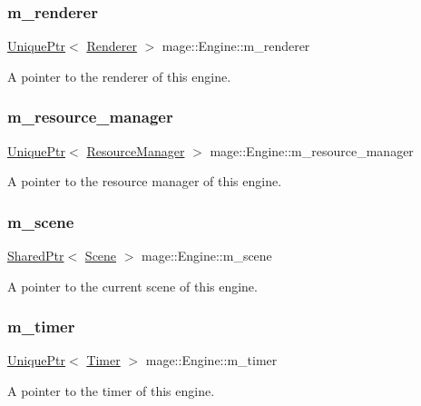 \subsubsection{\texorpdfstring{m\+\_\+renderer}{m\_renderer}}
{\footnotesize\ttfamily \hyperlink{namespacemage_a8c307fbcc33bce9b7f2aa4c26c3b95cf}{Unique\+Ptr}$<$ \hyperlink{classmage_1_1_renderer}{Renderer} $>$ mage\+::\+Engine\+::m\+\_\+renderer\hspace{0.3cm}{\ttfamily [private]}}

A pointer to the renderer of this engine. \hypertarget{classmage_1_1_engine_ac8d94579e72983a99a78be6b9b606a28}{}\label{classmage_1_1_engine_ac8d94579e72983a99a78be6b9b606a28} 
\subsubsection{\texorpdfstring{m\+\_\+resource\+\_\+manager}{m\_resource\_manager}}
{\footnotesize\ttfamily \hyperlink{namespacemage_a8c307fbcc33bce9b7f2aa4c26c3b95cf}{Unique\+Ptr}$<$ \hyperlink{classmage_1_1_resource_manager}{Resource\+Manager} $>$ mage\+::\+Engine\+::m\+\_\+resource\+\_\+manager\hspace{0.3cm}{\ttfamily [private]}}

A pointer to the resource manager of this engine. \hypertarget{classmage_1_1_engine_a82158ab9c1b60538ef8c46d5eb263bb8}{}\label{classmage_1_1_engine_a82158ab9c1b60538ef8c46d5eb263bb8} 
\subsubsection{\texorpdfstring{m\+\_\+scene}{m\_scene}}
{\footnotesize\ttfamily \hyperlink{namespacemage_a1e01ae66713838a7a67d30e44c67703e}{Shared\+Ptr}$<$ \hyperlink{classmage_1_1_scene}{Scene} $>$ mage\+::\+Engine\+::m\+\_\+scene\hspace{0.3cm}{\ttfamily [private]}}

A pointer to the current scene of this engine. \hypertarget{classmage_1_1_engine_a4daac998928a6c087b310c52b3f26ae4}{}\label{classmage_1_1_engine_a4daac998928a6c087b310c52b3f26ae4} 
\subsubsection{\texorpdfstring{m\+\_\+timer}{m\_timer}}
{\footnotesize\ttfamily \hyperlink{namespacemage_a8c307fbcc33bce9b7f2aa4c26c3b95cf}{Unique\+Ptr}$<$ \hyperlink{classmage_1_1_timer}{Timer} $>$ mage\+::\+Engine\+::m\+\_\+timer\hspace{0.3cm}{\ttfamily [private]}}

A pointer to the timer of this engine. 